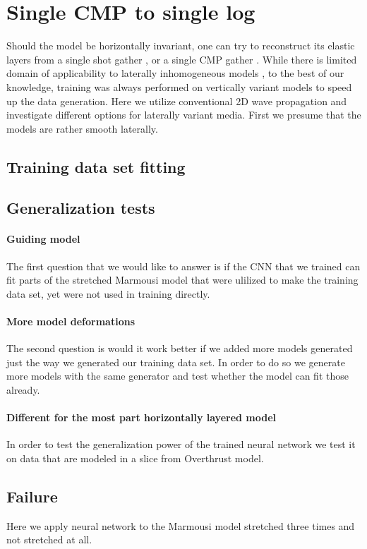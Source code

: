 \documentclass[manuscript]{geophysics}
\begin{document}
\section{Single CMP to single log}
Should the model be horizontally invariant, one can try to reconstruct its elastic layers from a single shot gather \citep{roth1994}, or a single CMP gather \citep{york2019}.
While there is limited domain of applicability to laterally inhomogeneous models \citep{york2019}, to the best of our knowledge, training was always performed on vertically variant models to speed up the data generation. Here we utilize conventional 2D wave propagation and investigate different options for laterally variant media. First we presume that the models are rather smooth laterally.
\subsection{Training data set fitting}


\subsection{Generalization tests}

\paragraph{Guiding model}
The first question that we would like to answer is if the CNN that we trained can fit parts of the stretched Marmousi model that were ulilized to make the training data set, yet were not used in training directly.


\paragraph{More model deformations}
The second question is would it work better if we added more models generated just the way we generated our training data set. In order to do so we generate more models with the same generator and test whether the model can fit those already.

\paragraph{Different for the most part horizontally layered model}
In order to test the generalization power of the trained neural network we test it on data that are modeled in a slice from Overthrust model.


\subsection{Failure}
Here we apply neural network to the Marmousi model stretched three times and not stretched at all.
\end{document}
